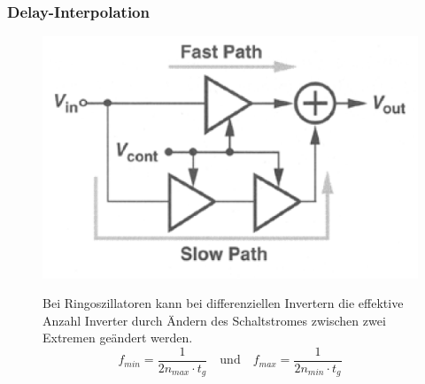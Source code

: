 \FloatBarrier
\subsubsection{Delay-Interpolation}
\begin{figure}[h!]
	\begin{minipage}{0.25\textwidth} 
      \includegraphics[width=1\textwidth]{images/Fast_Path}
    \end{minipage}
    \begin{minipage}{0.75\textwidth} 
       Bei Ringoszillatoren kann bei differenziellen Invertern die effektive Anzahl Inverter durch Ändern des Schaltstromes zwischen zwei Extremen geändert werden.
       \begin{equation*} 
         f_{min} =\frac{1}{2n_{max}\cdot t_g} \quad \text{und} \quad f_{max} =\frac{1}{2n_{min}\cdot t_g}  
       \end{equation*}
    \end{minipage}
\end{figure}